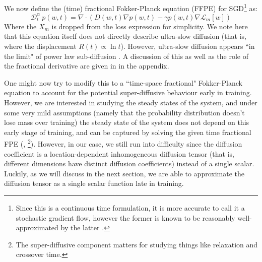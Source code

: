 \documentclass{article} %
\theoremstyle{definition}
\begin{document}

We now define the (time) fractional Fokker-Planck equation (FFPE) for SGD\footnote{Since this is a continuous time formulation, it is more accurate to call it a stochastic gradient flow, however the former is known to be reasonably well-approximated by the latter \citep{sgd_sde}.} as:
\label{FFPE}
\begin{equation}
    \mathcal{D}^\alpha_t\ p(w,t) = \nabla \cdot (D(w,t) \nabla p(w,t) - \gamma p(w,t)\nabla \mathcal{L}_m[w])
\end{equation}
Where the $X_m$ is dropped from the loss expression for simplicity. We note here that this equation itself does not directly describe ultra-slow diffusion (that is, where the displacement $R(t) \propto \ln t$). However, ultra-slow diffusion appears ``in the limit" of power law sub-diffusion \citep{Kochubei_2008}. A discussion of this as well as the role of the fractional derivative are given in in the appendix.

One might now try to modify this to a ``time-space fractional" Fokker-Planck equation to account for the potential super-diffusive behaviour early in training. However, we are interested in studying the steady states of the system, and under some very mild assumptions (namely that the probability distribution doesn't lose mass over training) the steady state of the system does not depend on this early stage of training, and can be captured by solving the given time fractional FPE (\citep{FFPE_inv_ss}, \citep{anom_diff_thermal}\footnote{The super-diffusive component matters for studying things like relaxation and crossover time.}). However, in our case, we still run into difficulty since the diffusion coefficient is a location-dependent inhomogeneous diffusion tensor (that is, different dimensions have distinct diffusion coefficients) instead of a single scalar. Luckily, as we will discuss in the next section, we are able to approximate the diffusion tensor as a single scalar function late in training.


\end{document}
